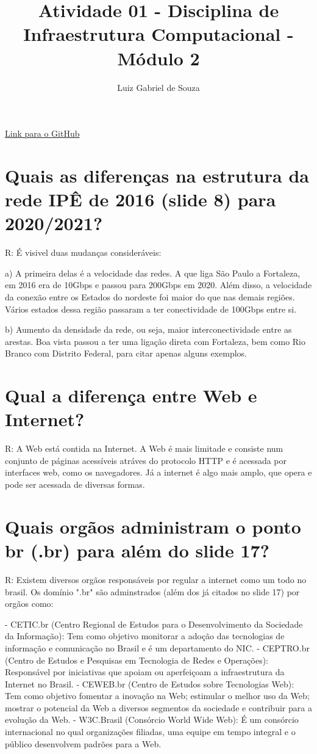 \documentclass{article}
\title{Atividade 01 - Disciplina de Infraestrutura Computacional - Módulo 2}
\author{Luiz Gabriel de Souza}
\begin{document}
\maketitle

\href{https://github.com/Luizgs7/Atividade_pratica_redes_internet_web_DSBD}{Link para o GitHub}

\section{Quais as diferenças na estrutura da rede IPÊ de 2016 (slide 8) para 2020/2021?}
R: É visivel duas mudanças consideráveis:

a) A primeira delas é a velocidade das redes. A que liga São Paulo a Fortaleza, em 2016 era de 10Gbps e passou para 200Gbps em 2020. 
Além disso, a velocidade da conexão entre os Estados do nordeste foi maior do que nas demais regiões. Vários estados dessa região passaram a ter conectividade de 100Gbps entre si.

b) Aumento da densidade da rede, ou seja, maior interconectividade entre as arestas. Boa vista passou a ter uma ligação direta com Fortaleza, bem como Rio Branco com Distrito Federal, para citar apenas alguns exemplos.

\section{Qual a diferença entre Web e Internet?}
R: A Web está contida na Internet. A Web é mais limitade e consiste num conjunto de páginas acessíveis atráves do protocolo HTTP e é acessada por interfaces web, como os navegadores. 
Já a internet é algo mais amplo, que opera e pode ser acessada de diversas formas.

\section{Quais orgãos administram o ponto br (.br) para além do slide 17?}

R: Existem diversos orgãos responsáveis por regular a internet como um todo no brasil. Os domínio ".br" são adminstrados (além dos já citados no slide 17) por orgãos como:

- CETIC.br (Centro Regional de Estudos para o Desenvolvimento da Sociedade da Informação): Tem como objetivo monitorar a adoção das tecnologias de informação e comunicação no Brasil e é um departamento do NIC.
- CEPTRO.br (Centro de Estudos e Pesquisas em Tecnologia de Redes e Operações): Responsável por iniciativas que apoiam ou aperfeiçoam a infraestrutura da Internet no Brasil.
- CEWEB.br (Centro de Estudos sobre Tecnologias Web): Tem como objetivo fomentar a inovação na Web; estimular o melhor uso da Web; mostrar o potencial da Web a diversos segmentos da sociedade e contribuir para a evolução da Web.
- W3C.Brasil (Consórcio World Wide Web): É um consórcio internacional no qual organizações filiadas, uma equipe em tempo integral e o público desenvolvem padrões para a Web.
\end{document}

